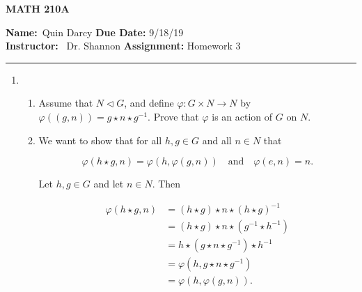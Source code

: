 \documentclass[12pt]{article}
\makeatletter
\theoremstyle{definition}
\theoremstyle{remark}
\renewenvironment{proof}[1][\proofname]{\par
  \pushQED{\qed}%
  \normalfont \topsep6\p@\@plus6\p@\relax
  \list{}{\leftmargin=0mm
          \rightmargin=0mm
          \settowidth{\itemindent}{\itshape#1}%
          \labelwidth=\itemindent
          \parsep=0pt \listparindent=\parindent 
  }
  \item[\hskip\labelsep
        \itshape
    #1\@addpunct{.}]\ignorespaces
}{%
  \popQED\endlist\@endpefalse
}
\let\oldproofname=\proofname
\renewcommand{\proofname}{\bf{\textit{\oldproofname}}}
\makeatother
\begin{document}
    \begin{center}
	    \vspace{.4cm} {\textbf { \large MATH 210A}}
    \end{center}
    {\textbf{Name:}\ Quin Darcy \hspace{\fill} \textbf{Due Date:} 9/18/19   \\
    { \textbf{Instructor:}} \ Dr. Shannon \hspace{\fill} \textbf{Assignment:} Homework 3 \\ \hrule}

    \justifying

    \begin{enumerate}[leftmargin=*]
        \item\hfill
            \begin{enumerate}[label=(\alph*)]
                \item Assume that $N\triangleleft G$, and define $\varphi\colon G\times N\rightarrow N$ by $\varphi((g,n))=g\star n\star g^{-1}$. Prove that $\varphi$ is an action of $G$ on $N$.
                    \begin{proof}
                        We want to show that for all $h,g\in G$ and all $n\in N$ that 
                        
                        \begin{equation*}
                            \varphi(h\star g,n)=\varphi(h,\varphi(g,n))\quad\text{and}\quad\varphi(e,n)=n.
                        \end{equation*}
                        
                        Let $h,g\in G$ and let $n\in N$. Then
                        
                        \begin{equation*}
                            \begin{split}
                                \varphi(h\star g,n) &= (h\star g)\star n\star(h\star g)^{-1} \\
                                &= (h\star g)\star n\star(g^{-1}\star h^{-1}) \\
                                &= h\star (g\star n\star g^{-1})\star h^{-1} \\
                                &= \varphi(h,g\star n\star g^{-1}) \\
                                &= \varphi(h,\varphi(g,n)).
                            \end{split}
                        \end{equation*}
                        

\end{proof}
\end{enumerate}
\end{enumerate}
\end{document}
